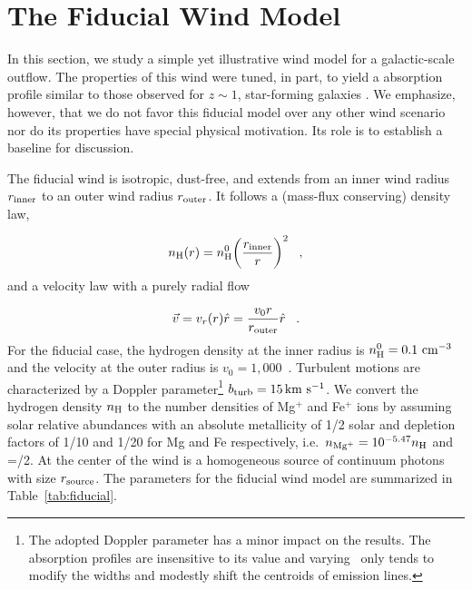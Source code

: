\documentclass[12pt,preprint]{aastex}
\begin{document}
\section{The Fiducial Wind Model}
\label{sec:fiducial}

In this section, we study a simple yet illustrative wind model for
a galactic-scale outflow.  The properties of this wind were tuned, in
part, to yield a  absorption profile 
similar to those observed for $z \sim 1$, star-forming galaxies
\citep{wcp+09,rubin+10c}.  We emphasize, however, that we do not
favor this fiducial model over any other wind scenario nor do its
properties have special physical motivation.
Its role is to establish a baseline
for discussion.

The fiducial wind is isotropic, dust-free, and extends from an inner wind
radius $r_{\rm inner}$ to an outer wind radius $r_{\rm outer}$.  
It follows a (mass-flux conserving) density law,

\begin{equation}
n_{\rm H} (r) = n^0_{\rm H} \biggl( \frac{r_{\rm inner}}{r}  \biggr)^2\;\;\; , 
\label{eqn:density}
\end{equation}
and a velocity law with a purely radial flow

\begin{equation}
\vec v = v_r (r) \hat r = \frac{v_0 r}{r_{\rm outer}} \hat r  \;\;\; .
\label{eqn:vel}
\end{equation}
For the fiducial case,  the hydrogen density at
the inner radius is $n_{\rm H}^0 = 0.1~{\rm cm}^{-3}$ and the
velocity at the outer radius is $v_0 = 1,000$~\kms. Turbulent motions are
characterized by a Doppler parameter\footnote{
  The adopted Doppler parameter
 has a minor impact on the results.
  The absorption profiles are insensitive to its value and varying \bturb\
  only tends to modify the widths and modestly
  shift the centroids of emission lines.} 
$b_{\rm turb} = 15 \, {\rm km~s^{-1}}$.  
We convert the hydrogen density $n_{\rm H}$ to the number densities of
Mg$^+$ and Fe$^+$ ions by assuming solar relative abundances with an
absolute metallicity of 1/2 solar and depletion factors of 1/10 and
1/20 for Mg and Fe respectively, i.e.\  $n_{\rm Mg^+} = 10^{-5.47} n_{\rm H}$ 
and \nfe=\nmg/2. At the center of the wind is a homogeneous source of
continuum photons with size $r_{\rm source}$. The parameters for the
fiducial wind model are summarized in Table~\ref{tab:fiducial}.   
\end{document}
